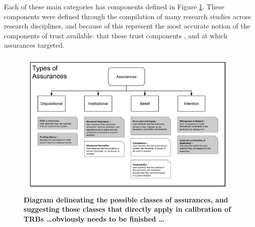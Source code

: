         Each of these main categories  has components defined in Figure \ref{fig:Assurance_classes}. These components were defined through the compilation of many research studies across research disciplines, and because of this represent the most accurate notion of the components of trust available.  that these trust components  , and at which assurances  targeted. 

        \begin{figure}
            \includegraphics[width=8in]{Figures/Assurances.pdf}%
            \caption{\textbf{Diagram delineating the possible classes of assurances, and suggesting those classes that directly apply in calibration of TRBs \ldots obviously needs to be finished \ldots}}
            \label{fig:Assurance_classes}
        \end{figure}
